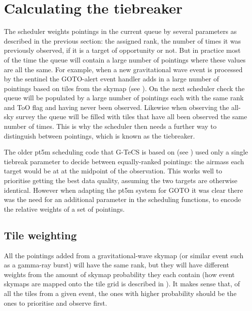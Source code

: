 
\newpage
\section{Calculating the tiebreaker}
\label{sec:scheduler_tiebreaker}
\begin{colsection}


\begin{colsection}

The scheduler weights pointings in the current queue by several parameters as described in the previous section: the assigned rank, the number of times it was previously observed, if it is a target of opportunity or not. But in practice most of the time the queue will contain a large number of pointings where these values are all the same. For example, when a new gravitational wave event is processed by the sentinel the GOTO-alert event handler adds in a large number of pointings based on tiles from the skymap (see ). On the next scheduler check the queue will be populated by a large number of pointings each with the same rank and ToO flag and having never been observed. Likewise when observing the all-sky survey the queue will be filled with tiles that have all been observed the same number of times. This is why the scheduler then needs a further way to distinguish between pointings, which is known as the tiebreaker.

The older pt5m scheduling code that G-TeCS is based on (see ) used only a single tiebreak parameter to decide between equally-ranked pointings: the airmass each target would be at at the midpoint of the observation. This works well to prioritise getting the best data quality, assuming the two targets are otherwise identical. However when adapting the pt5m system for GOTO it was clear there was the need for an additional parameter in the scheduling functions, to encode the relative weights of a set of pointings.

\end{colsection}

\subsection{Tile weighting}
\label{sec:weights}
\begin{colsection}

 All the pointings added from a gravitational-wave skymap (or similar event such as a gamma-ray burst) will have the same rank, but they will have different weights from the amount of skymap probability they each contain (how event skymaps are mapped onto the tile grid is described in ). It makes sense that, of all the tiles from a given event, the ones with higher probability should be the ones to prioritise and observe first.


\end{colsection}
\end{colsection}
